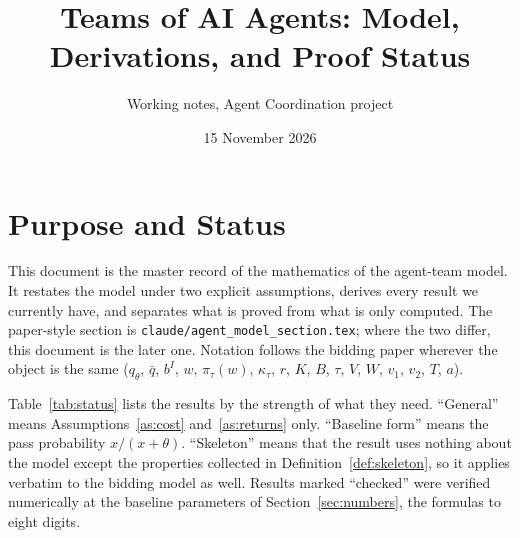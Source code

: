 \documentclass[11pt]{article}
\title{Teams of AI Agents: Model, Derivations, and Proof Status}
\author{Working notes, Agent Coordination project}
\date{15 November 2026}
\theoremstyle{definition}
\begin{document}
\maketitle

\section{Purpose and Status}

This document is the master record of the mathematics of the agent-team model. It restates the model under two explicit assumptions, derives every result we currently have, and separates what is proved from what is only computed. The paper-style section is \texttt{claude/agent\_model\_section.tex}; where the two differ, this document is the later one. Notation follows the bidding paper wherever the object is the same ($q_\theta$, $\bar q$, $b^I$, $w$, $\pi_\tau(w)$, $\kappa_\tau$, $r$, $K$, $B$, $\tau$, $V$, $W$, $v_1$, $v_2$, $T$, $a$).

Table~\ref{tab:status} lists the results by the strength of what they need. ``General'' means Assumptions~\ref{as:cost} and~\ref{as:returns} only. ``Baseline form'' means the pass probability $x/(x+\theta)$. ``Skeleton'' means that the result uses nothing about the model except the properties collected in Definition~\ref{def:skeleton}, so it applies verbatim to the bidding model as well. Results marked ``checked'' were verified numerically at the baseline parameters of Section~\ref{sec:numbers}, the formulas to eight digits.
\end{document}
